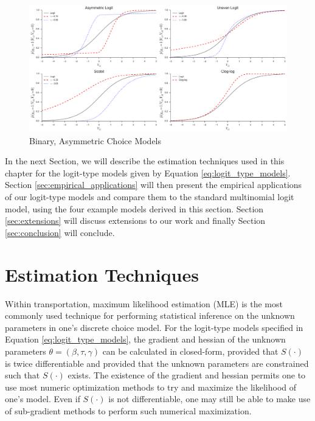 \begin{figure}
\centering
\includegraphics[width=\textwidth]{chapter3/images/Fig2_600dpi}
\caption{Binary, Asymmetric Choice Models}
\label{fig:asym_models}
\end{figure}

In the next Section, we will describe the estimation techniques used in this chapter for the logit-type models given by Equation \ref{eq:logit_type_models}. Section \ref{sec:empirical_applications} will then present the empirical applications of our logit-type models and compare them to the standard multinomial logit model, using the four example models derived in this section. Section \ref{sec:extensions} will discuss extensions to our work and finally Section \ref{sec:conclusion} will conclude.

\section{Estimation Techniques}
\label{sec:model_estimation}
Within transportation, maximum likelihood estimation (MLE) is the most commonly used technique for performing statistical inference on the unknown parameters in one's discrete choice model. For the logit-type models specified in Equation \ref{eq:logit_type_models}, the gradient and hessian of the unknown parameters $\theta = \left( \beta, \tau, \gamma \right)$ can be calculated in closed-form, provided that $S\left( \cdot \right)$ is twice differentiable and provided that the unknown parameters are constrained such that $S\left( \cdot \right)$ exists. The existence of the gradient and hessian permits one to use most numeric optimization methods to try and maximize the likelihood of one's model. Even if $S\left( \cdot \right)$ is not differentiable, one may still be able to make use of sub-gradient methods to perform such numerical maximization. 

